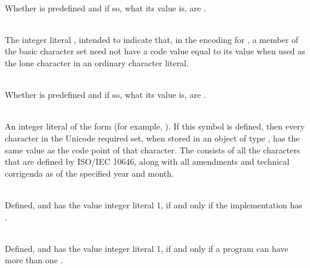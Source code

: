 \begin{description}
\item
{}%
\\
Whether  is predefined and if so, what its value is,
are .

\item
{}%
\\
The integer literal , intended to indicate that, in the encoding for
, a member of the basic character set need not have a code value equal to
its value when used as the lone character in an ordinary character literal.

\item
{}%
\\
Whether  is predefined and if so, what its value is,
are .

\item
{}%
\\
An integer literal of the form  (for example,
).
If this symbol is defined, then every character in the Unicode required set, when
stored in an object of type , has the same value as the code point
of that character. The  consists of all
the characters that are defined by ISO/IEC 10646, along with
all amendments and technical corrigenda as of the specified year and month.

\item
{}%
\\
Defined, and has the value integer literal 1, if and only if the implementation
has .

\item
{}%
\\
Defined, and has the value integer literal 1, if and only if a program
can have more than one .

\end{description}

